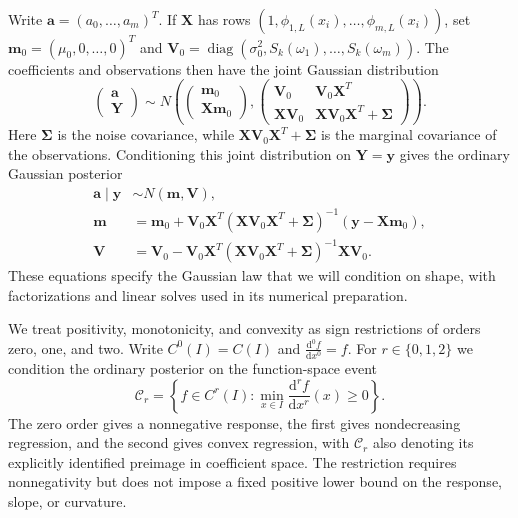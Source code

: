 Write $\boldsymbol a=(a_0,\ldots,a_m)^T$. If $\boldsymbol X$ has rows
$(1,\phi_{1,L}(x_i),\ldots,\phi_{m,L}(x_i))$, set
$\boldsymbol m_0=(\mu_0,0,\ldots,0)^T$ and
$\boldsymbol V_0=\operatorname{diag}(\sigma_0^2,S_k(\omega_1),\ldots,S_k(\omega_m))$.
The coefficients and observations then have the joint Gaussian distribution
\[
 \begin{pmatrix}\boldsymbol a\\\boldsymbol Y\end{pmatrix}
 \sim N\left(
 \begin{pmatrix}\boldsymbol m_0\\\boldsymbol X\boldsymbol m_0\end{pmatrix},
 \begin{pmatrix}
  \boldsymbol V_0 & \boldsymbol V_0\boldsymbol X^T\\
  \boldsymbol X\boldsymbol V_0 &
  \boldsymbol X\boldsymbol V_0\boldsymbol X^T+\boldsymbol\Sigma
 \end{pmatrix}
 \right).
\]
Here $\boldsymbol\Sigma$ is the noise covariance, while
$\boldsymbol X\boldsymbol V_0\boldsymbol X^T+\boldsymbol\Sigma$
is the marginal covariance of the observations. Conditioning this joint
distribution on $\boldsymbol Y=\boldsymbol y$ gives the ordinary Gaussian posterior
\begin{equation}\label{eq:gaussian-posterior}
 \begin{aligned}
 \boldsymbol a\mid\boldsymbol y&\sim N(\boldsymbol m,\boldsymbol V),\\
 \boldsymbol m&=\boldsymbol m_0+\boldsymbol V_0\boldsymbol X^T
       (\boldsymbol X\boldsymbol V_0\boldsymbol X^T+\boldsymbol\Sigma)^{-1}
       (\boldsymbol y-\boldsymbol X\boldsymbol m_0),\\
 \boldsymbol V&=\boldsymbol V_0-\boldsymbol V_0\boldsymbol X^T
       (\boldsymbol X\boldsymbol V_0\boldsymbol X^T+\boldsymbol\Sigma)^{-1}
       \boldsymbol X\boldsymbol V_0.
 \end{aligned}
\end{equation}
These equations specify the Gaussian law that we
will condition on shape, with factorizations and linear solves used
in its numerical preparation.

We treat positivity, monotonicity, and convexity as sign restrictions
of orders zero, one, and two. Write $C^0(I)=C(I)$ and
$\frac{\mathrm{d}^0f}{\mathrm{d}x^0}=f$. For $r\in\{0,1,2\}$ we condition the ordinary
posterior on the function-space event
\begin{equation}\label{eq:shape-event}
 \mathcal C_r=\left\{f\in C^r(I):
                 \min_{x\in I}\frac{\mathrm{d}^rf}{\mathrm{d}x^r}(x)\geq0\right\}.
\end{equation}
The zero order gives a nonnegative response, the first gives
nondecreasing regression, and the second gives convex regression, with
$\mathcal C_r$ also denoting its explicitly identified preimage in
coefficient space. The restriction requires nonnegativity but does
not impose a fixed positive lower bound on the response, slope, or
curvature.

